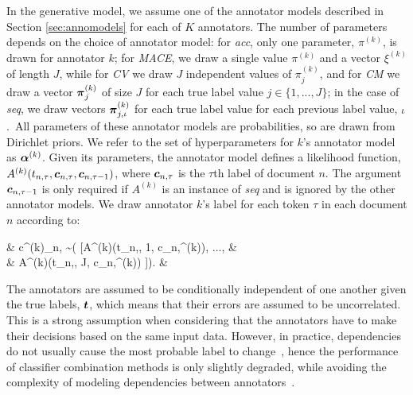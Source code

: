 In the generative model, we assume one of the annotator 
models described in Section \ref{sec:annomodels} for each of $K$ annotators.
The number of parameters depends on the choice of annotator model:
for \emph{acc}, only one parameter, $\pi^{(k)}$, is drawn for annotator $k$;
for \emph{MACE}, we draw a single value $\pi^{(k)}$ and a vector $\xi^{(k)}$ of length $J$, 
while for \emph{CV} we draw $J$ independent values of $\pi_j^{(k)}$, 
and for \emph{CM}  
we draw a vector $\boldsymbol\pi^{(k)}_j$ of size $J$ for each true label value $j\in \{1,...,J\}$; in the case of \emph{seq}, 
we draw vectors $\boldsymbol\pi^{(k)}_{j,\iota}$ for each true label value 
for each previous label value, $\iota$.\
All parameters of these annotator models are probabilities, 
so are drawn from Dirichlet priors. We refer to the set of hyperparameters 
for $k$'s annotator model as $\boldsymbol\alpha^{(k)}$.
Given its parameters, the annotator model defines a likelihood function,
$A^{(k)}(t_{n,\tau}, \boldsymbol c_{n,\tau}, \boldsymbol c_{n,\tau-1})$, where $\boldsymbol c_{n,\tau}$ is the $\tau$th label of document $n$.
The argument $\boldsymbol c_{n,\tau-1}$ is only required if $A^{(k)}$ is an instance
of \emph{seq} and is ignored by the other annotator models.
We draw annotator $k$'s label for each token $\tau$ in each document $n$ 
according to:
\begin{flalign}
& c^{(k)}_{n,\tau} \sim {}( [A^{(k)}(t_{n,\tau}, 1, \bs c_{n,}^{(k)}), ..., & \nonumber \\
& \hspace{3cm} A^{(k)}(t_{n,\tau}, J, \bs c_{n,\tau-1}^{(k)}) ]). &
\end{flalign}
The annotators are assumed to be conditionally independent of one another given the true labels,
$\boldsymbol t$, which means that their errors are assumed to be uncorrelated. This is a strong assumption
when considering that the annotators have to make their decisions based
on the same input data. However, in practice, dependencies do not usually cause the 
most probable label to change~\citep{zhang2004optimality}, hence the performance of classifier combination methods 
is only slightly degraded, while avoiding the complexity of modeling dependencies between annotators~\citep{kim2012bayesian}.
%
